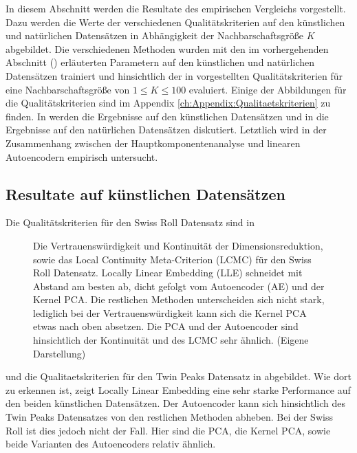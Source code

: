 In diesem Abschnitt werden die Resultate des empirischen Vergleichs vorgestellt. Dazu werden die
Werte der verschiedenen Qualitätskriterien auf den künstlichen und natürlichen Datensätzen in
Abhängigkeit der Nachbarschaftsgröße $K$ abgebildet. Die verschiedenen Methoden wurden mit den im
vorhergehenden Abschnitt () erläuterten
Parametern auf den künstlichen und natürlichen Datensätzen trainiert und hinsichtlich der in
 vorgestellten Qualitätskriterien für
eine Nachbarschaftsgröße von $1 \leq K \leq 100$ evaluiert. Einige der Abbildungen für die
Qualitätskriterien sind im Appendix \ref{ch:Appendix:Qualitaetskriterien} zu finden. In
 werden die Ergebnisse auf den künstlichen
Datensätzen und in  die Ergebnisse auf den
natürlichen Datensätzen diskutiert. Letztlich wird in 
der Zusammenhang zwischen der Hauptkomponentenanalyse und linearen Autoencodern empirisch
untersucht.

\subsection{Resultate auf künstlichen Datensätzen}
\label{ch:Vergleich:sec:Resultate:kuenstlich}

Die Qualitätskriterien für den Swiss Roll Datensatz sind in 
\begin{figure}[ht]
	\begin{center}
		
	\end{center}
	\caption[Swiss Roll Qualitätskriterien]{Die Vertrauenswürdigkeit und Kontinuität der Dimensionsreduktion, sowie das Local Continuity Meta-Criterion (LCMC) für den Swiss Roll Datensatz. Locally Linear Embedding (LLE) schneidet mit Abstand am besten ab, dicht gefolgt vom Autoencoder (AE) und der Kernel PCA. Die restlichen Methoden unterscheiden sich nicht stark, lediglich bei der Vertrauenswürdigkeit kann sich die Kernel PCA etwas nach oben absetzen. Die PCA und der Autoencoder sind hinsichtlich der Kontinuität und des LCMC sehr ähnlich. (Eigene Darstellung)}
	\label{fig:SwissRollMetrics}
\end{figure}
und die Qualitaetskriterien für den Twin Peaks Datensatz in  abgebildet. Wie dort zu erkennen ist, zeigt Locally Linear Embedding eine sehr starke Performance auf den beiden künstlichen Datensätzen. Der Autoencoder kann sich hinsichtlich des Twin Peaks Datensatzes von den restlichen Methoden abheben. Bei der Swiss Roll ist dies jedoch nicht der Fall. Hier sind die PCA, die Kernel PCA, sowie beide Varianten des Autoencoders relativ ähnlich.

